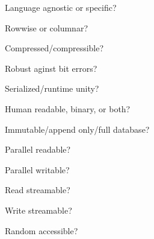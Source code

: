 \documentclass[aspectratio=169]{beamer}
\begin{document}
\begin{frame}{Language agnostic or specific?}
\vspace{0.5 cm}
\end{frame}

\begin{frame}{Rowwise or columnar?}
\vspace{0.5 cm}
\end{frame}

\begin{frame}{Compressed/compressible?}
\vspace{0.5 cm}
\end{frame}

\begin{frame}{Robust aginst bit errors?}
\vspace{0.5 cm}
\end{frame}

\begin{frame}{Serialized/runtime unity?}
\vspace{0.5 cm}
\end{frame}

\begin{frame}{Human readable, binary, or both?}
\vspace{0.5 cm}
\end{frame}

\begin{frame}{Immutable/append only/full database?}
\vspace{0.5 cm}
\end{frame}

\begin{frame}{Parallel readable?}
\vspace{0.5 cm}
\end{frame}

\begin{frame}{Parallel writable?}
\vspace{0.5 cm}
\end{frame}

\begin{frame}{Read streamable?}
\vspace{0.5 cm}
\end{frame}

\begin{frame}{Write streamable?}
\vspace{0.5 cm}
\end{frame}

\begin{frame}{Random accessible?}
\vspace{0.5 cm}
\end{frame}
\end{document}
